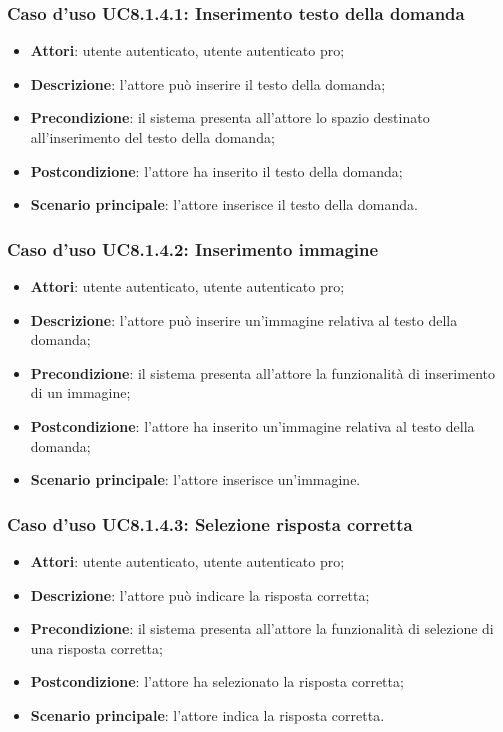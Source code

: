 \subsubsection{Caso d'uso UC8.1.4.1: Inserimento testo della domanda}
	\begin{itemize}
		\item
			\textbf{Attori}: utente autenticato, utente autenticato pro;
		\item		
			\textbf{Descrizione}: l'attore può inserire il testo della domanda;
		\item
			\textbf{Precondizione}: il sistema presenta all'attore lo spazio destinato all'inserimento del testo della domanda; 
		\item
			\textbf{Postcondizione}: l'attore ha inserito il testo della domanda;
		\item
			\textbf{Scenario principale}: l'attore inserisce il testo della domanda. 
	 			
	\end{itemize}
	
\subsubsection{Caso d'uso UC8.1.4.2: Inserimento immagine}
	\begin{itemize}
		\item
			\textbf{Attori}: utente autenticato, utente autenticato pro;
		\item		
			\textbf{Descrizione}: l'attore può inserire un'immagine relativa al testo della domanda;
		\item
			\textbf{Precondizione}: il sistema presenta all'attore la funzionalità di inserimento di un immagine; 
		\item
			\textbf{Postcondizione}: l'attore ha inserito un'immagine relativa al testo della domanda;
		\item
			\textbf{Scenario principale}: l'attore inserisce un'immagine.						
	\end{itemize}
	

\subsubsection{Caso d'uso UC8.1.4.3: Selezione risposta corretta}
	\begin{itemize}
		\item
			\textbf{Attori}: utente autenticato, utente autenticato pro;
		\item		
			\textbf{Descrizione}: l'attore può indicare la risposta corretta;
		\item
			\textbf{Precondizione}: il sistema presenta all'attore la funzionalità di selezione di una risposta corretta; 
		\item
			\textbf{Postcondizione}: l'attore ha selezionato la risposta corretta;
		\item
			\textbf{Scenario principale}: l'attore indica la risposta corretta.  			
	\end{itemize}
